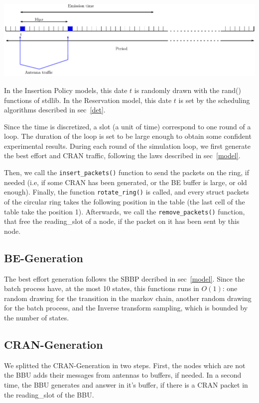 \documentclass[a4paper,10pt]{article}
\begin{document}
\begin{center}   

      \includegraphics[width=\textwidth]{emission_antenna.pdf}

  
\end{center}

	 In the Insertion Policy models, this date $t$ is randomly drawn with the rand() functions of stdlib. In the Reservation model, this date $t$ is set by the scheduling algorithms described in sec~\ref{det}.
	
	Since the time is discretized, a slot (a unit of time) correspond to one round of a loop. The duration of the loop is set to be large enough to obtain some confident experimental results. During each round of the simulation loop, we first generate the best effort and CRAN traffic, following the laws described in sec~\ref{model}.
	
	Then, we call the \texttt{insert\_packets()} function to send the packets on the ring, if needed (i.e, if some CRAN has been generated, or the BE buffer is large, or old enough).
	Finally, the function \texttt{rotate\_ring()} is called, and every struct packets of the circular ring takes the following position in the table (the last cell of the table take the position 1).
	Afterwards, we call the \texttt{remove\_packets()} function, that free the reading\_slot of a node, if the packet on it has been sent by this node.
	\subsection{BE-Generation}
	The best effort generation follows the SBBP decribed in sec~\ref{model}. Since the batch process have, at the most 10 states, this functions runs in $O(1)$: one random drawing for the transition in the markov chain, another random drawing for the batch process, and the Inverse transform sampling, which is bounded by the number of states.
	\subsection{CRAN-Generation}
	We splitted the CRAN-Generation in two steps. First, the nodes which are not the BBU adds their messages from antennas to buffers, if needed. In a second time, the BBU generates and answer in it's buffer, if there is a CRAN packet in the reading\_slot of the BBU.
	
\end{document}
